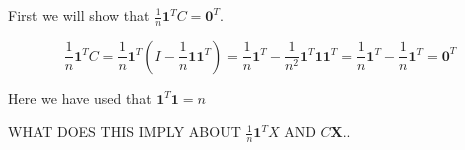 First we will show that $\frac{1}{n}\textbf{1}^T C = \textbf{0}^T$. 

$$\frac{1}{n}\textbf{1}^T C = \frac{1}{n} \textbf{1}^T \left(I - \frac{1}{n} \textbf{1}\textbf{1}^T\right) = \frac{1}{n} \textbf{1}^T - \frac{1}{n^2} \textbf{1}^T \textbf{1}\textbf{1}^T = \frac{1}{n} \textbf{1}^T - \frac{1}{n} \textbf{1}^T = \textbf{0}^T$$

Here we have used that $\textbf{1}^T \textbf{1} = n$

WHAT DOES THIS IMPLY ABOUT $\frac{1}{n}\textbf{1}^TX$ AND $C\textbf{X}$.. 



